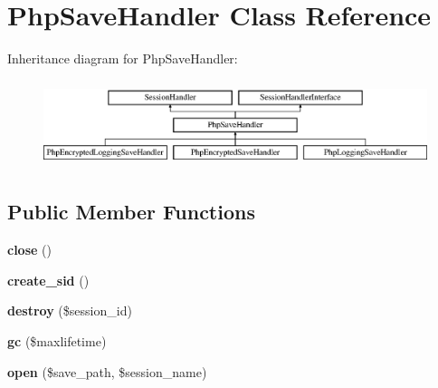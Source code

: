 \hypertarget{class_pes_1_1_session_1_1_save_handler_1_1_php_save_handler}{}\section{Php\+Save\+Handler Class Reference}
\label{class_pes_1_1_session_1_1_save_handler_1_1_php_save_handler}
Inheritance diagram for Php\+Save\+Handler\+:\begin{figure}[H]
\begin{center}
\leavevmode
\includegraphics[height=2.557078cm]{class_pes_1_1_session_1_1_save_handler_1_1_php_save_handler}
\end{center}
\end{figure}
\subsection*{Public Member Functions}
\begin{DoxyCompactItemize}
\item 
\mbox{\label{class_pes_1_1_session_1_1_save_handler_1_1_php_save_handler_aa69c8bf1f1dcf4e72552efff1fe3e87e}} 
{\bfseries close} ()
\item 
\mbox{\label{class_pes_1_1_session_1_1_save_handler_1_1_php_save_handler_a005d23d3154d7869c1a41cf0b6c538e6}} 
{\bfseries create\+\_\+sid} ()
\item 
\mbox{\label{class_pes_1_1_session_1_1_save_handler_1_1_php_save_handler_aaec5812f6b4eb6835f88d3baa06a002a}} 
{\bfseries destroy} (\$session\+\_\+id)
\item 
\mbox{\label{class_pes_1_1_session_1_1_save_handler_1_1_php_save_handler_a57aff7ee0656d8aa75d545fb8b3ae35d}} 
{\bfseries gc} (\$maxlifetime)
\item 
\mbox{\label{class_pes_1_1_session_1_1_save_handler_1_1_php_save_handler_a439723f419a676a012053e84a22010cc}} 
{\bfseries open} (\$save\+\_\+path, \$session\+\_\+name)
\end{DoxyCompactItemize}


